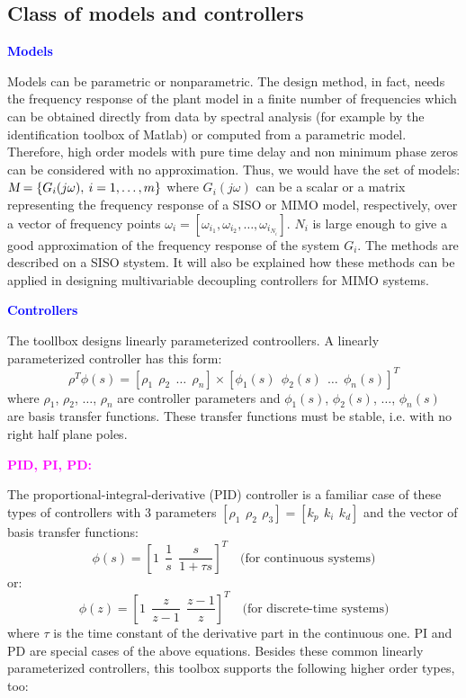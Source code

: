 \documentclass [12pt , a4paper] {article}
\begin{document}
\subsection{Class of models and controllers}
\textcolor{blue}{\textbf{Models}}

Models can be parametric or nonparametric. The design method, in fact, needs the frequency response of the plant model in a finite number of frequencies which can be obtained directly from data by spectral analysis (for example by the identification toolbox of Matlab) or computed from a parametric model. Therefore, high order models with pure time delay and non minimum phase zeros can be considered with no approximation. Thus, we would have the set of models:  $\textsl{M}=\{G_i(j\omega), \: i=1,\ldots,m \}$ where $G_i(j\omega)$ can be a scalar or a matrix representing the frequency response of a SISO or MIMO model, respectively, over a vector of frequency points $\omega_i=[\omega_{i_1}, \omega_{i_2}, \ldots, \omega_{i_{N_i}}]$. $N_i$ is large enough to give a good approximation of the frequency response of the system $G_i$. The methods are described on a SISO stystem. It will also be explained how these methods can be applied in designing multivariable decoupling controllers for MIMO systems.  

\textcolor{blue}{\textbf{Controllers}}

The toollbox designs linearly parameterized controollers. A linearly parameterized controller has this form:
\begin{equation}
\label{linparcon}
\rho^T \phi(s)=[\rho_1 \: \: \rho_2 \: \: \ldots \:\: \rho_n]\times [\phi_1(s) \: \: \phi_2(s) \:\: \ldots \:\: \phi_n(s)]^T
\end{equation}
where $\rho_1$, $\rho_2$, $\ldots$, $\rho_n$ are controller parameters and $\phi_1(s)$, $\phi_2(s)$, $\ldots$, $\phi_n(s)$ are basis transfer functions. These transfer functions must be stable, i.e. with no right half plane poles. 

\textcolor{magenta}{\textbf{PID, PI, PD:}}

The proportional-integral-derivative (PID) controller is a familiar case of these types of controllers with 3 parameters $[\rho_1 \:\, \rho_2 \:\, \rho_3]=[k_p \:\, k_i \:\, k_d]$ and the vector of basis transfer functions:
\begin{equation}
\phi (s)=[1 \:\: \frac{1}{s} \:\: \frac{s}{1+\tau s}]^T \quad \mbox{(for continuous systems)}
\end{equation}
or:
\begin{equation}
\phi (z)=[1 \:\: \frac{z}{z-1} \:\: \frac{z-1}{z}]^T \quad \mbox{(for discrete-time systems)}
\end{equation}
where $\tau$ is the time constant of the derivative part in the continuous one. PI and PD are special cases of the above equations. Besides these common linearly parameterized controllers, this toolbox supports the following higher order types, too: 
\end{document}

